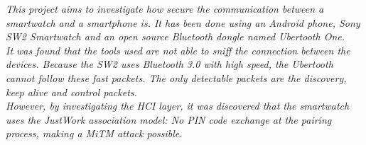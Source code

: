 \textit{This project aims to investigate how secure the communication between a smartwatch and a smartphone is. It has been done using an Android phone, Sony SW2 Smartwatch and an open source Bluetooth dongle named Ubertooth One.}\\
\textit{It was found that the tools used are not able to sniff the connection between the devices. Because the SW2 uses Bluetooth 3.0 with high speed, the Ubertooth cannot follow these fast packets. The only detectable packets are the discovery, keep alive and control packets.}\\
\textit{However, by investigating the HCI layer, it was discovered that the smartwatch uses the JustWork association model: No PIN code exchange at the pairing process, making a MiTM attack possible.}\\
